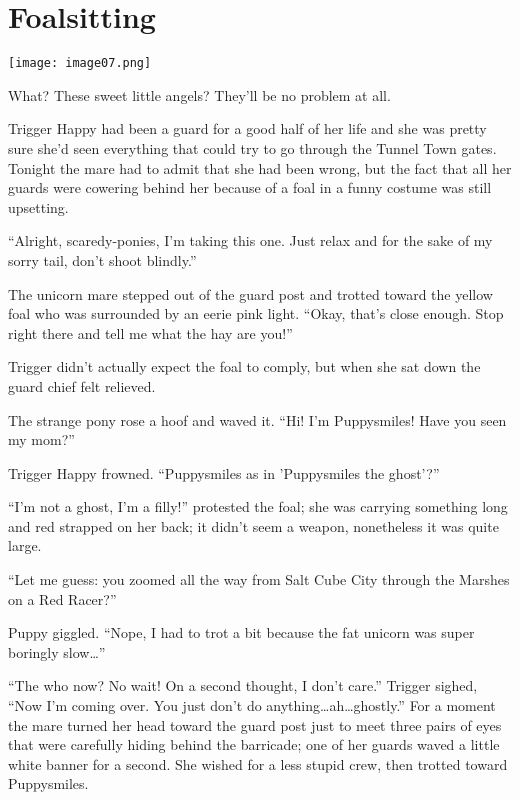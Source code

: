 \chapter{Foalsitting}

\texttt{[image: image07.png]}

\begin{intro}
    What? These sweet little angels? They'll be no problem at all.
\end{intro}


Trigger Happy had been a guard for a good half of her life and she was pretty sure she'd seen everything that could try to go through the Tunnel Town gates. Tonight the mare had to admit that she had been wrong, but the fact that all her guards were cowering behind her because of a foal in a funny costume was still upsetting.

``Alright, scaredy-ponies, I'm taking this one. Just relax and for the sake of my sorry tail, don't shoot blindly.''

The unicorn mare stepped out of the guard post and trotted toward the yellow foal who was surrounded by an eerie pink light. ``Okay, that's close enough. Stop right there and tell me what the hay are you!''

Trigger didn't actually expect the foal to comply, but when she sat down the guard chief felt relieved.

The strange pony rose a hoof and waved it. ``Hi! I'm Puppysmiles! Have you seen my mom?''

Trigger Happy frowned. ``Puppysmiles as in 'Puppysmiles the ghost'?''

``I'm not a ghost, I'm a filly!'' protested the foal; she was carrying something long and red strapped on her back; it didn't seem a weapon, nonetheless it was quite large.

``Let me guess: you zoomed all the way from Salt Cube City through the Marshes on a Red Racer?''

Puppy giggled. ``Nope, I had to trot a bit because the fat unicorn was super boringly slow\dots''

``The who now? No wait! On a second thought, I don't care.'' Trigger sighed, ``Now I'm coming over. You just don't do anything\dots ah\dots ghostly.'' For a moment the mare turned her head toward the guard post just to meet three pairs of eyes that were carefully hiding behind the barricade; one of her guards waved a little white banner for a second. She wished for a less stupid crew, then trotted toward Puppysmiles.


